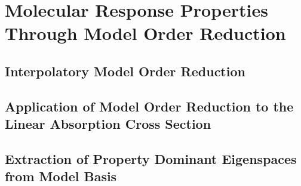 \chapter{Molecular Response Properties Through Model Order Reduction}

\section{Interpolatory Model Order Reduction}

\section{Application of Model Order Reduction to the Linear Absorption 
  Cross Section}

\section{Extraction of Property Dominant Eigenspaces from Model Basis}


